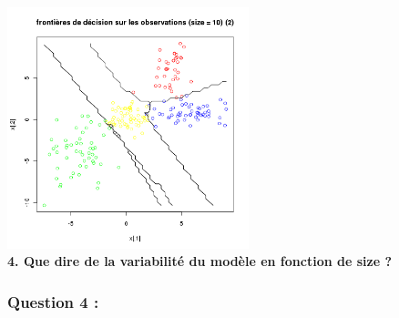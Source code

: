\documentclass[a4paper, 10pt]{article}
\begin{document}
\includegraphics[height = 7cm, width = 7cm]{plots/frontiere_bayes_q3_3_10.png}\\
\textbf{4. Que dire de la variabilité du modèle en fonction de size ?}\\

\subsubsection*{Question 4 :}
\end{document}
